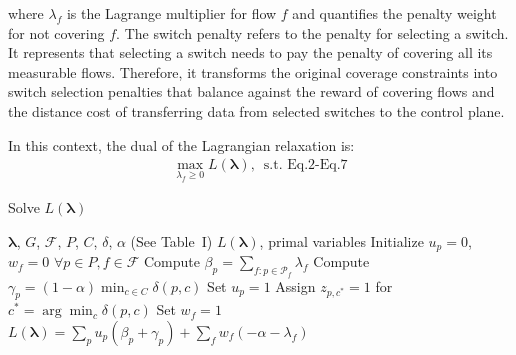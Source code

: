 \noindent where $\lambda_f$ is the Lagrange multiplier for flow $f$ and quantifies the penalty weight for not covering $f$. The switch penalty refers to the penalty for selecting a switch. It represents that selecting a switch needs to pay the penalty of covering all its measurable flows. Therefore, it transforms the original coverage constraints into switch selection penalties that balance against the reward of covering flows and the distance cost of transferring data from selected switches to the control plane. 

In this context, the dual of the Lagrangian relaxation is:
\begin{align}
\max_{\lambda_f \geq 0} L(\boldsymbol{\lambda}), \, \text{ s.t. Eq.2-Eq.7}
\end{align}

\begin{algorithm}[t]
\caption{Solve \( L(\boldsymbol{\lambda}) \)}
\label{alg:solve-lagrangian}
\begin{algorithmic}[1]
\footnotesize
\Require \(\boldsymbol{\lambda}\), \(G\), \(\mathcal{F}\), \(P\), \(C\), \(\delta\), \(\alpha\) (See Table~I)
\Ensure \(L(\boldsymbol{\lambda})\), primal variables
\State Initialize \(u_p = 0\), \(w_f = 0\) \(\forall p \in P, f \in \mathcal{F}\)
  \State Compute \(\beta_p = \sum_{f: p \in \mathcal{P}_f} \lambda_f\) 
  \State Compute \(\gamma_p = (1-\alpha) \min_{c \in C} \delta(p, c)\) 
   
    \State Set \(u_p = 1\)
    \State Assign \(z_{p,c^*} = 1\) for \(c^* = \arg\min_c \delta(p,c)\)
  \EndIf
\EndFor
{}
    \State Set \(w_f = 1\) 
  \EndIf
\EndFor
\State \Return \(L(\boldsymbol{\lambda}) = \sum_p u_p (\beta_p + \gamma_p) + \sum_f w_f (-\alpha - \lambda_f)\)
\end{algorithmic}
\end{algorithm}


